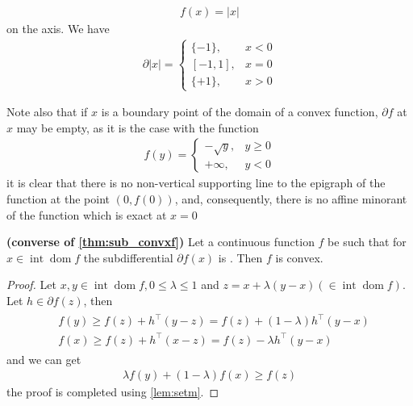 \documentclass{article}
\newcommand{\bfs}[1]{\textbf{({#1}) }}
\newcommand{\inte}{\operatorname{int}}
\newcommand{\dom}{\operatorname{dom}}
\begin{document}
\begin{exma}
\begin{align*}
f(x)=|x|
\end{align*}
on the axis. We have
\begin{align*}
\partial|x|= \begin{cases}\{-1\}, & x<0 \\ {[-1,1],} & x=0 \\ \{+1\}, & x>0\end{cases}
\end{align*}
\end{exma}
\begin{exma}\label{exm:nvd}
Note also that if $x$ is a boundary point of the domain of a convex function, $\partial f$ at $x$ may be empty, as it is the case with the function
\begin{align*}
f(y)= \begin{cases}-\sqrt{y}, & y \geq 0 \\ +\infty, & y<0\end{cases}
\end{align*}
it is clear that there is no non-vertical supporting line to the epigraph of the function at the point $(0, f(0))$, and, consequently, there is no affine minorant of the function which is exact at $x=0$
\end{exma}

\begin{cora}\bfs{converse of \cref{thm:sub_convxf}}\label{cora:conv_subvxf}
Let a continuous function $f$ be such that for  $x \in\inte \dom f$ the subdifferential $\partial f(x)$ is . Then $f$ is convex.
\end{cora} 
\begin{proof}\color{ForestGreen}
Let $x, y \in\inte \dom f, 0 \leq \lambda \leq 1$ and $z=x+\lambda(y-x)(\in\inte \dom f)$. Let $h \in \partial f(z)$, then
\begin{align*}
\begin{aligned}
&f(y) \geq f(z)+h^{\top}(y-z)=f(z)+(1-\lambda) h^{\top}(y-x) \\
&f(x) \geq f(z)+h^{\top}(x-z)=f(z)-\lambda h^{\top}(y-x)
\end{aligned}
\end{align*}
and we can get 
\begin{align*}
\lambda f(y)+(1-\lambda) f(x) \geq f(z)
\end{align*}
the proof is completed using \cref{lem:setm}.
\end{proof}
\end{document}
